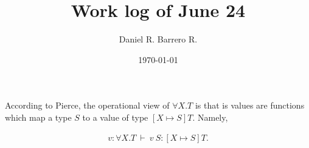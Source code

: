 \documentclass{amsart}
\title{Work log of June 24}
\author{Daniel R. Barrero R.}
\date{\today}
\begin{document}
\maketitle

\section{}

According to Pierce, the operational view of $\forall X . T$ is that is values are functions
which map a type $S$ to a value of type $[X \mapsto S]T$. Namely,

\begin{eqnarray*}
	v : \forall X . T \ \vdash \ v \ S : [X \mapsto S]T.
\end{eqnarray*}
\end{document}
